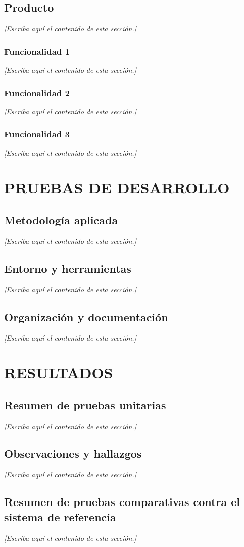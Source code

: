 \documentclass[12pt,letterpaper,oneside]{article}
\newcommand{\pendiente}[1][Escriba aquí el contenido de esta sección.]{%
  {\color{gray!75}\itshape [#1]}\par}
\newcommand{\capitulo}[1]{\clearpage\section{#1}}
\begin{document}
\subsection{Producto}
\pendiente

\subsubsection{Funcionalidad 1}
\pendiente

\subsubsection{Funcionalidad 2}
\pendiente

\subsubsection{Funcionalidad 3}
\pendiente

\capitulo{PRUEBAS DE DESARROLLO}

\subsection{Metodología aplicada}
\pendiente

\subsection{Entorno y herramientas}
\pendiente

\subsection{Organización y documentación}
\pendiente

\capitulo{RESULTADOS}

\subsection{Resumen de pruebas unitarias}
\pendiente

\subsection{Observaciones y hallazgos}
\pendiente

\subsection{Resumen de pruebas comparativas contra el sistema de referencia}
\pendiente
\end{document}
